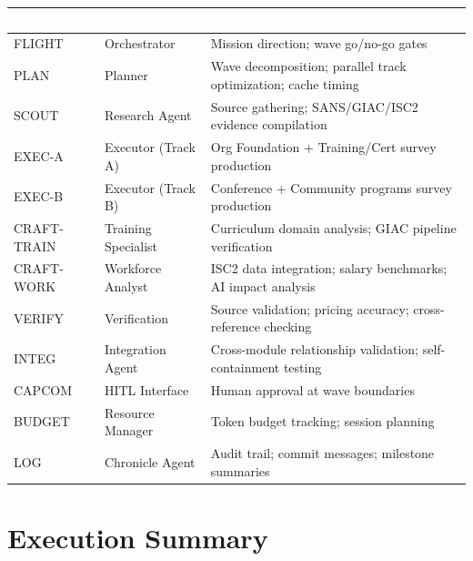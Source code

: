 \documentclass[11pt,letterpaper]{article}
\newcommand{\tableheader}[1]{\textbf{\sffamily\textcolor{white}{#1}}}
\begin{document}
\begin{center}
\begin{tabularx}{\textwidth}{L{2.5cm}L{2.5cm}X}
\toprule
{}
\tableheader{Role} & \tableheader{Agent} & \tableheader{Responsibility} \\
\midrule
FLIGHT & Orchestrator & Mission direction; wave go/no-go gates \\
PLAN & Planner & Wave decomposition; parallel track optimization; cache timing \\
SCOUT & Research Agent & Source gathering; SANS/GIAC/ISC2 evidence compilation \\
EXEC-A & Executor (Track A) & Org Foundation + Training/Cert survey production \\
EXEC-B & Executor (Track B) & Conference + Community programs survey production \\
CRAFT-TRAIN & Training Specialist & Curriculum domain analysis; GIAC pipeline verification \\
CRAFT-WORK & Workforce Analyst & ISC2 data integration; salary benchmarks; AI impact analysis \\
VERIFY & Verification & Source validation; pricing accuracy; cross-reference checking \\
INTEG & Integration Agent & Cross-module relationship validation; self-containment testing \\
CAPCOM & HITL Interface & Human approval at wave boundaries \\
BUDGET & Resource Manager & Token budget tracking; session planning \\
LOG & Chronicle Agent & Audit trail; commit messages; milestone summaries \\
\bottomrule
\end{tabularx}
\end{center}

\section{Execution Summary}
\end{document}

